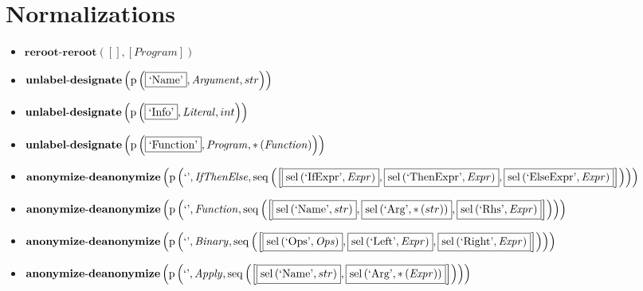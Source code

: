 \section{Normalizations}
{\footnotesize\begin{itemize}
\item $\mathbf{reroot\text{-}reroot}\left([],[\mathit{Program}]\right)$
\item $\mathbf{unlabel\text{-}designate}\\\left(\mathrm{p}\left(\fbox{\text{`Name'}},\mathit{Argument},str\right)\right)$
\item $\mathbf{unlabel\text{-}designate}\\\left(\mathrm{p}\left(\fbox{\text{`Info'}},\mathit{Literal},int\right)\right)$
\item $\mathbf{unlabel\text{-}designate}\\\left(\mathrm{p}\left(\fbox{\text{`Function'}},\mathit{Program},{*}\left(\mathit{Function}\right)\right)\right)$
\item $\mathbf{anonymize\text{-}deanonymize}\\\left(\mathrm{p}\left(\text{`'},\mathit{IfThenElse},\mathrm{seq}\left(\left[\fbox{$\mathrm{sel}\left(\text{`IfExpr'},\mathit{Expr}\right)$}, \fbox{$\mathrm{sel}\left(\text{`ThenExpr'},\mathit{Expr}\right)$}, \fbox{$\mathrm{sel}\left(\text{`ElseExpr'},\mathit{Expr}\right)$}\right]\right)\right)\right)$
\item $\mathbf{anonymize\text{-}deanonymize}\\\left(\mathrm{p}\left(\text{`'},\mathit{Function},\mathrm{seq}\left(\left[\fbox{$\mathrm{sel}\left(\text{`Name'},str\right)$}, \fbox{$\mathrm{sel}\left(\text{`Arg'},{*}\left(str\right)\right)$}, \fbox{$\mathrm{sel}\left(\text{`Rhs'},\mathit{Expr}\right)$}\right]\right)\right)\right)$
\item $\mathbf{anonymize\text{-}deanonymize}\\\left(\mathrm{p}\left(\text{`'},\mathit{Binary},\mathrm{seq}\left(\left[\fbox{$\mathrm{sel}\left(\text{`Ops'},\mathit{Ops}\right)$}, \fbox{$\mathrm{sel}\left(\text{`Left'},\mathit{Expr}\right)$}, \fbox{$\mathrm{sel}\left(\text{`Right'},\mathit{Expr}\right)$}\right]\right)\right)\right)$
\item $\mathbf{anonymize\text{-}deanonymize}\\\left(\mathrm{p}\left(\text{`'},\mathit{Apply},\mathrm{seq}\left(\left[\fbox{$\mathrm{sel}\left(\text{`Name'},str\right)$}, \fbox{$\mathrm{sel}\left(\text{`Arg'},{*}\left(\mathit{Expr}\right)\right)$}\right]\right)\right)\right)$

\end{itemize}}
